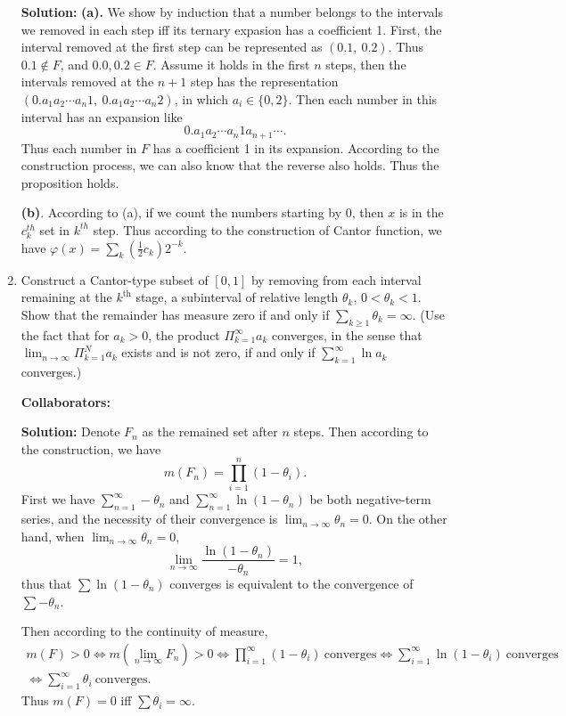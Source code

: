 \documentclass{article}%
\begin{document}
\begin{enumerate}
\textbf{Solution:}
\textbf{(a).} We show by induction that a number belongs to the intervals we removed in each step iff its ternary expasion has a coefficient 1. First, the interval removed at the first step can be represented as $(0.1, ~0.2)$. Thus $0.1 \notin F$, and $0.0, 0.2\in F$. Assume it holds in the first $n$ steps, then the intervals removed at the $n+1$ step has the representation $(0.a_1a_2\cdots a_n1, ~0.a_1a_2\cdots a_n2)$, in which $a_i\in\{0, 2\}$. Then each number in this interval has an expansion like
$$
0.a_1a_2\cdots a_n1a_{n+1}\cdots.
$$
Thus each number in $F$ has a coefficient 1 in its expansion.
According to the construction process, we can also know that the reverse also holds. Thus the proposition holds.

\textbf{(b)}. 
According to (a), if we count the numbers starting by $0$, then $x$ is in the $c_{k}^{th}$ set in $k^{th}$ step. Thus according to the construction of Cantor function, we have $\varphi(x) = \sum_{k}(\frac{1}{2}c_k)2^{-k}$.
\bigskip

\item  Construct a Cantor-type subset of $[0,1]$ by removing from each interval remaining at the $k^{\text{th}}$ stage, a subinterval of relative length $\theta_k$, $0 < \theta_k < 1$. Show that the remainder has measure zero if and only if $\sum_{k\geq 1} \theta_k = \infty$.  (Use the fact that for $a_k > 0$, the product $\Pi_{k = 1}^{\infty} a_k$ converges, in the sense that $\lim_{n\to \infty} \Pi_{k=1}^N a_k$ exists and  is not zero, if and only if $\sum_{k =1}^{\infty} \ln a_k$ converges.)

\bigskip
\textbf{Collaborators:}\\
\smallskip
 
\textbf{Solution:}
Denote $F_n$ as the remained set after $n$ steps. Then according to the construction, we have 
$$
m(F_n) = \prod_{i=1}^{n}(1-\theta_i).
$$
First we have $\sum_{n=1}^{\infty}-\theta_n$ and $\sum_{n=1}^{\infty}\ln(1-\theta_n)$ be both negative-term series, and the necessity of their convergence is $\lim_{n\to\infty}\theta_n = 0$. On the other hand, when $\lim_{n\to\infty} \theta_n = 0$, 
$$
\lim_{n\to\infty}\frac{\ln(1-\theta_n)}{-\theta_n} = 1,
$$
thus that $\sum{\ln(1-\theta_n)}$ converges is equivalent to the convergence of $\sum{-\theta_n}$.

Then according to the continuity of measure,
$$
\begin{aligned}
m(F) > 0 \Leftrightarrow m(\lim_{n\to\infty}F_n) > 0 \Leftrightarrow \prod_{i=1}^{\infty}(1-\theta_i) ~\text{converges} \Leftrightarrow \sum_{i=1}^{\infty} \ln(1-\theta_i) ~\text{converges} \\
\Leftrightarrow \sum_{i=1}^{\infty}\theta_i ~\text{converges}.
\end{aligned}
$$
Thus $m(F) = 0$ iff $\sum{\theta_i} = \infty$.


\end{enumerate}
\end{document}
